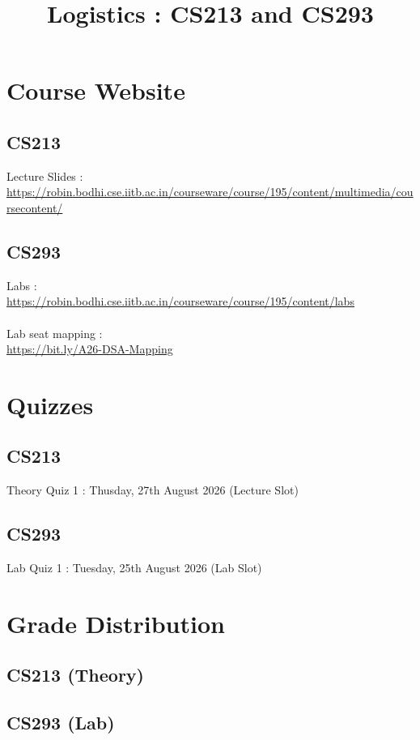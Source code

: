 \documentclass{article}
\title{Logistics : CS213 and CS293}
\author{}
\date{}
\begin{document}
\maketitle

\section{Course Website}
\subsection{CS213}
Lecture Slides : \\\url{https://robin.bodhi.cse.iitb.ac.in/courseware/course/195/content/multimedia/coursecontent/}
\subsection{CS293}
Labs : \\
\url{https://robin.bodhi.cse.iitb.ac.in/courseware/course/195/content/labs}
\\\\
Lab seat mapping : \\\url{https://bit.ly/A26-DSA-Mapping}
\section{Quizzes}

        \subsection{CS213}
        Theory Quiz 1 : Thusday, 27th August 2026 (Lecture Slot)
        \subsection{CS293}
        Lab Quiz 1 : Tuesday, 25th August 2026 (Lab Slot)
\newpage
\section{Grade Distribution}
\subsection{CS213 (Theory)}
\subsection{CS293 (Lab)}
\end{document}
